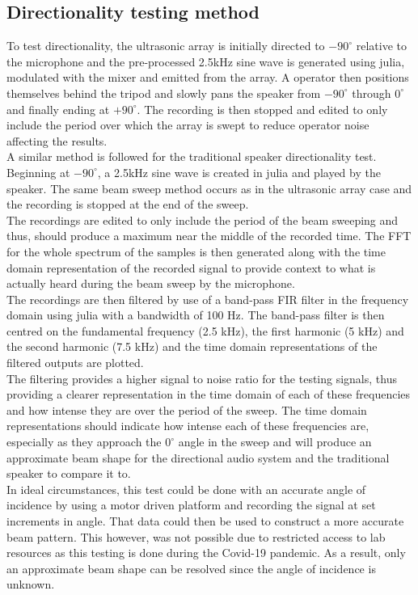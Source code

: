 \subsection{Directionality testing method}
To test directionality, the ultrasonic array is initially directed to $-90^\circ$ relative to the microphone and the pre-processed 2.5kHz sine wave is generated using julia, modulated with the mixer and emitted from the array. A operator then positions themselves behind the tripod and slowly pans the speaker from $-90^\circ$ through $0^\circ$ and finally ending at $+90^\circ$. The recording is then stopped and edited to only include the period over which the array is swept to reduce operator noise affecting the results.\\
A similar method is followed for the traditional speaker directionality test. Beginning at $-90^\circ$, a 2.5kHz sine wave is created in julia and played by the speaker. The same beam sweep method occurs as in the ultrasonic array case and the recording is stopped at the end of the sweep.\\
The recordings are edited to only include the period of the beam sweeping and thus, should produce a maximum near the middle of the recorded time. The FFT for the whole spectrum of the samples is then generated along with the time domain representation of the recorded signal to provide context to what is actually heard during the beam sweep by the microphone.\\
The recordings are then filtered by use of a band-pass FIR filter in the frequency domain using julia with a bandwidth of 100 Hz. The band-pass filter is then centred on the fundamental frequency (2.5 kHz), the first harmonic (5 kHz) and the second harmonic (7.5 kHz) and the time domain representations of the filtered outputs are plotted.\\
The filtering provides a higher signal to noise ratio for the testing signals, thus providing a clearer representation in the time domain of each of these frequencies and how intense they are over the period of the sweep. The time domain representations should indicate how intense each of these frequencies are, especially as they approach the $0^\circ$ angle in the sweep and will produce an approximate beam shape for the directional audio system and the traditional speaker to compare it to.\\
In ideal circumstances, this test could be done with an accurate angle of incidence by using a motor driven platform and recording the signal at set increments in angle. That data could then be used to construct a more accurate beam pattern. This however, was not possible due to restricted access to lab resources as this testing is done during the Covid-19 pandemic. As a result, only an approximate beam shape can be resolved since the angle of incidence is unknown.

